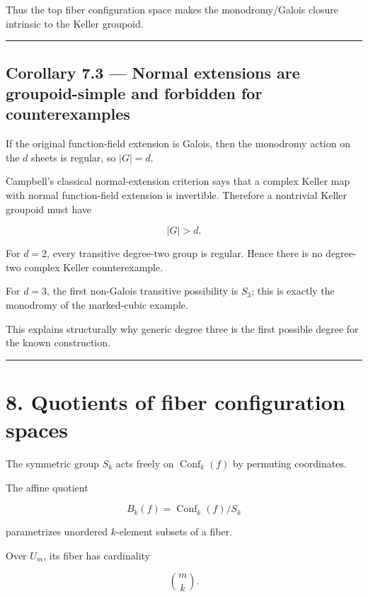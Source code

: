 Thus the top fiber configuration space makes the monodromy/Galois
closure intrinsic to the Keller groupoid.

\begin{center}\rule{0.5\linewidth}{0.5pt}\end{center}

\subsection{Corollary 7.3 --- Normal extensions are groupoid-simple and
forbidden for
counterexamples}\label{corollary-7.3-normal-extensions-are-groupoid-simple-and-forbidden-for-counterexamples}

If the original function-field extension is Galois, then the monodromy
action on the \(d\) sheets is regular, so \(|G|=d\).

Campbell's classical normal-extension criterion says that a complex
Keller map with normal function-field extension is invertible. Therefore
a nontrivial Keller groupoid must have

\[
|G|>d.
\]

For \(d=2\), every transitive degree-two group is regular. Hence there
is no degree-two complex Keller counterexample.

For \(d=3\), the first non-Galois transitive possibility is \(S_3\);
this is exactly the monodromy of the marked-cubic example.

This explains structurally why generic degree three is the first
possible degree for the known construction.

\begin{center}\rule{0.5\linewidth}{0.5pt}\end{center}

\section{8. Quotients of fiber configuration
spaces}\label{quotients-of-fiber-configuration-spaces}

The symmetric group \(S_k\) acts freely on \(\operatorname{Conf}_k(f)\)
by permuting coordinates.

The affine quotient

\[
B_k(f)=\operatorname{Conf}_k(f)/S_k
\]

parametrizes unordered \(k\)-element subsets of a fiber.

Over \(U_m\), its fiber has cardinality

\[
\binom{m}{k}.
\]

